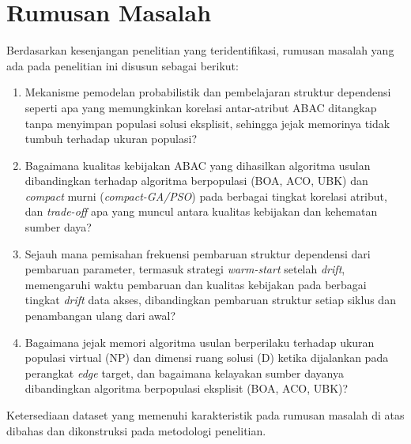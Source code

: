 \section{Rumusan Masalah}

Berdasarkan kesenjangan penelitian yang teridentifikasi, rumusan masalah yang ada pada penelitian ini disusun sebagai berikut:
\begin{enumerate}
    \item Mekanisme pemodelan probabilistik dan pembelajaran struktur dependensi seperti apa yang memungkinkan korelasi antar-atribut ABAC ditangkap tanpa menyimpan populasi solusi eksplisit, sehingga jejak memorinya tidak tumbuh terhadap ukuran populasi?
    \item Bagaimana kualitas kebijakan ABAC yang dihasilkan algoritma usulan dibandingkan terhadap algoritma berpopulasi (BOA\label{first:boa}, ACO, UBK) dan \textit{compact} murni (\textit{compact-GA\label{first:compact-ga}/PSO}) pada berbagai tingkat korelasi atribut, dan \textit{trade-off} apa yang muncul antara kualitas kebijakan dan kehematan sumber daya?
    \item Sejauh mana pemisahan frekuensi pembaruan struktur dependensi dari pembaruan parameter, termasuk strategi \textit{warm-start} setelah \textit{drift}, memengaruhi waktu pembaruan dan kualitas kebijakan pada berbagai tingkat \textit{drift} data akses, dibandingkan pembaruan struktur setiap siklus dan penambangan ulang dari awal?
    \item Bagaimana jejak memori algoritma usulan berperilaku terhadap ukuran populasi virtual (NP) dan dimensi ruang solusi (D) ketika dijalankan pada perangkat \textit{edge} target, dan bagaimana kelayakan sumber dayanya dibandingkan algoritma berpopulasi eksplisit (BOA, ACO, UBK)?
\end{enumerate}
Ketersediaan dataset yang memenuhi karakteristik pada rumusan masalah di atas dibahas dan dikonstruksi pada metodologi penelitian.